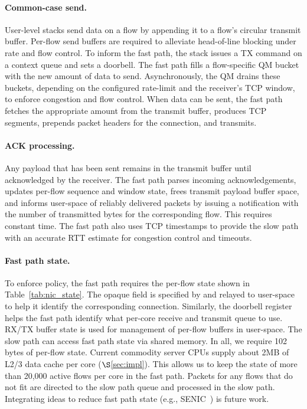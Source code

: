 \paragraph{Common-case send.} User-level stacks send data on a flow by
appending it to a flow's circular transmit buffer. Per-flow send
buffers are required to alleviate head-of-line blocking under rate and
flow control. To inform the fast path, the stack issues a TX command
on a context queue and sets a doorbell.  The fast path fills a
flow-specific QM bucket with the new amount of data to
send. Asynchronously, the QM drains these buckets, depending on the
configured rate-limit and the receiver's TCP window, to enforce
congestion and flow control. When data can be sent, the fast path
fetches the appropriate amount from the transmit buffer, produces TCP
segments, prepends packet headers for the connection, and
transmits. %

\paragraph{ACK processing.} Any payload that has been sent remains in
the transmit buffer until acknowledged by the receiver. The fast path
parses incoming acknowledgements, updates per-flow sequence and window
state, frees transmit payload buffer space, and informs user-space of
reliably delivered packets by issuing a notification with the number
of transmitted bytes for the corresponding flow. This requires
constant time. The fast path also uses TCP timestamps to provide the
slow path with an accurate RTT estimate for congestion control and
timeouts.

\paragraph{Fast path state.} To enforce policy, the fast path requires
the per-flow state shown in Table~\ref{tab:nic_state}. The opaque
field is specified by and relayed to user-space to help it identify
the corresponding connection. Similarly, the doorbell register helps
the fast path identify what per-core receive and transmit queue to
use.  RX/TX buffer state is used for management of per-flow buffers in
user-space.  The slow path can access fast path state via shared
memory.  In all, we require 102 bytes of per-flow state. Current
commodity server CPUs supply about 2MB of L2/3 data cache per core
($\S$\ref{sec:impl}). This allows us to keep the state of more than
20,000 active flows per core in the fast path. Packets for any flows
that do not fit are directed to the slow path queue and processed in
the slow path. Integrating ideas to reduce fast path state (e.g.,
SENIC~\cite{senic}) is future work.

